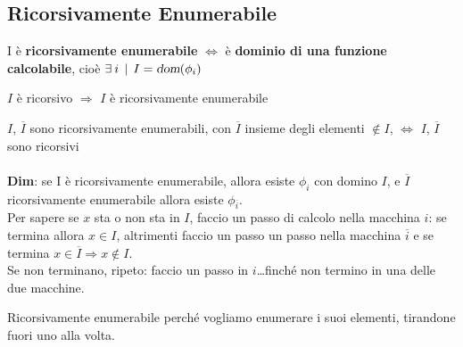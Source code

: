 \documentclass[10pt]{book}
\begin{document}
\subsection{Ricorsivamente Enumerabile}
I è \textbf{ricorsivamente enumerabile} $\Leftrightarrow$ è \textbf{dominio di una funzione calcolabile}, cioè $\exists\: i\:\:|\:\: I = \textsl{dom}(\phi_i)$
\begin{list}{}{}
	\item $I$ è ricorsivo $\Rightarrow$ $I$ è ricorsivamente enumerabile
	\item $I$, $\overline{I}$ sono ricorsivamente enumerabili, con $\overline{I}$ insieme degli elementi $\not\in I$, $\Leftrightarrow$ $I$, $\overline{I}$ sono ricorsivi\\\\
	\textbf{Dim}: se I è ricorsivamente enumerabile, allora esiste $\phi_i$ con domino $I$, e $\overline{I}$ ricorsivamente enumerabile allora esiste $\phi_{\overline{i}}$.\\
	Per sapere se $x$ sta o non sta in $I$, faccio un passo di calcolo nella macchina $i$: se termina allora $x \in I$, altrimenti faccio un passo un passo nella macchina $\overline{i}$ e se termina $x \in \overline{I} \Rightarrow x \not\in I$.\\
	Se non terminano, ripeto: faccio un passo in $i$\ldots finché non termino in una delle due macchine.
\end{list}
Ricorsivamente enumerabile perché vogliamo enumerare i suoi elementi, tirandone fuori uno alla volta.
\end{document}

